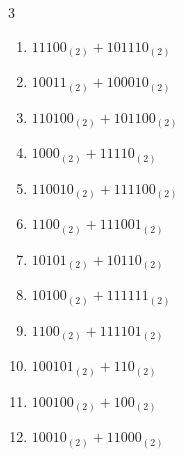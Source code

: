 


\setcounter{quesnum}{30}

\begin{multicols}{3}
\begin{enumerate}
  \itemsep=30pt
  \item $11100_{(2)} + 101110_{(2)}$


  \item $10011_{(2)} + 100010_{(2)}$


  \item $110100_{(2)} + 101100_{(2)}$


  \item $1000_{(2)} + 11110_{(2)}$


  \item $110010_{(2)} + 111100_{(2)}$


  \item $1100_{(2)} + 111001_{(2)}$


  \item $10101_{(2)} + 10110_{(2)}$


  \item $10100_{(2)} + 111111_{(2)}$


  \item $1100_{(2)} + 111101_{(2)}$


  \item $100101_{(2)} + 110_{(2)}$


\columnbreak %

  \item $100100_{(2)} + 100_{(2)}$


  \item $10010_{(2)} + 11000_{(2)}$


\end{enumerate}
\end{multicols}
